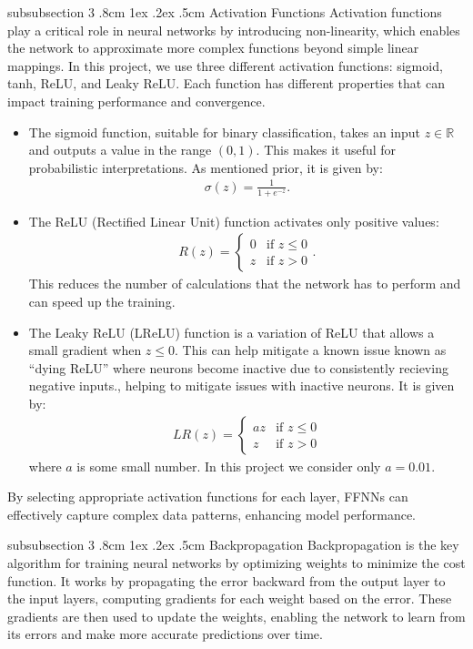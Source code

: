 \documentclass[%
reprint,
amsmath,amssymb,
aps,
]{revtex4-2}
\makeatletter
\renewcommand{\subsubsection}{%
	\@startsection
	{subsubsection}%
	{3}%
	{\z@}%
	{.8cm \@plus1ex \@minus .2ex}%
	{.5cm}%
	{\normalfont\small\centering}%
}
\makeatother
\begin{document}
\subsubsection{Activation Functions}
Activation functions play a critical role in neural networks by introducing non-linearity, which enables the network to approximate more complex functions beyond simple linear mappings. In this project, we use three different activation functions: sigmoid, tanh, ReLU, and Leaky ReLU. Each function has different properties that can impact training performance and convergence.
\begin{itemize}
	\item The sigmoid function, suitable for binary classification, takes an input $z\in\mathbb{R}$ and outputs a value in the range $(0,1)$. This makes it useful for probabilistic interpretations. As mentioned prior, it is given by:
	\begin{align} 
		\sigma(z)=\frac{1}{1+e^{-z}}.
	\end{align}
	\item The ReLU (Rectified Linear Unit) function activates only positive values: 
	\begin{align} 
		R(z)=
		\begin{cases}
			0 & \text{if }z\leq0\\z&\text{if }z>0
		\end{cases}.
	\end{align}
	This reduces the number of calculations that the network has to perform and can speed up the training.
	\item The Leaky ReLU (LReLU) function is a variation of ReLU that allows a small gradient when $z\leq0$. This can help mitigate a known issue known as ``dying ReLU'' where neurons become inactive due to consistently recieving negative inputs., helping to mitigate issues with inactive neurons. It is given by:
	\begin{align} 
		LR(z)=
		\begin{cases} 
			az&\text{if }z\leq0\\z&\text{if }z> 0 
		\end{cases} 
	\end{align}
	where $a$ is some small number. In this project we consider only $a=0.01$.
\end{itemize}
By selecting appropriate activation functions for each layer, FFNNs can effectively capture complex data patterns, enhancing model performance.

\subsubsection{Backpropagation}
Backpropagation is the key algorithm for training neural networks by optimizing weights to minimize the cost function. It works by propagating the error backward from the output layer to the input layers, computing gradients for each weight based on the error. These gradients are then used to update the weights, enabling the network to learn from its errors and make more accurate predictions over time.
\end{document}
